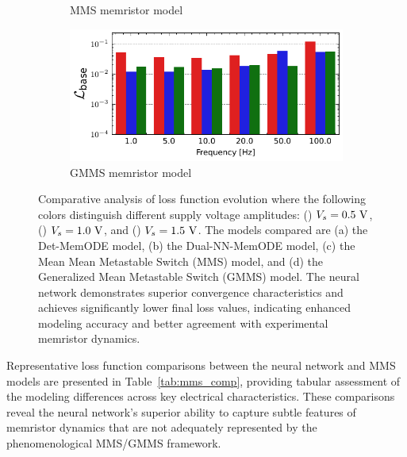 \documentclass[11pt, oneside]{article}
\begin{document}
\begin{figure}[htbp!]
\begin{subfigure}[c]{0.48\linewidth}
        \caption{MMS memristor model}
    \end{subfigure}
    \begin{subfigure}[c]{0.48\linewidth}
        \centering
        \includegraphics[width=\linewidth]{mms_results/loss_per_freq_GMMS Model.pdf}
        \caption{GMMS memristor model}
    \end{subfigure}
    \caption{Comparative analysis of loss function evolution where the following colors distinguish different supply voltage amplitudes: (\redbar{}) \(V_s=0.5\rm \ V\), (\bluebar{}) \(V_s=1.0\rm \ V\), and (\greenbar{}) \(V_s=1.5\rm \ V\). The models compared are (a) the Det-MemODE model, (b) the Dual-NN-MemODE model, (c) the Mean Mean Metastable Switch (MMS) model, and (d) the Generalized Mean Metastable Switch (GMMS) model. The neural network demonstrates superior convergence characteristics and achieves significantly lower final loss values, indicating enhanced modeling accuracy and better agreement with experimental memristor dynamics.}

    \label{fig:comparison_mms}
\end{figure}

Representative loss function comparisons between the neural network and MMS models are presented in Table~\ref{tab:mms_comp}, providing tabular assessment of the modeling differences across key electrical characteristics. These comparisons reveal the neural network's superior ability to capture subtle features of memristor dynamics that are not adequately represented by the phenomenological MMS/GMMS framework.
\end{document}
